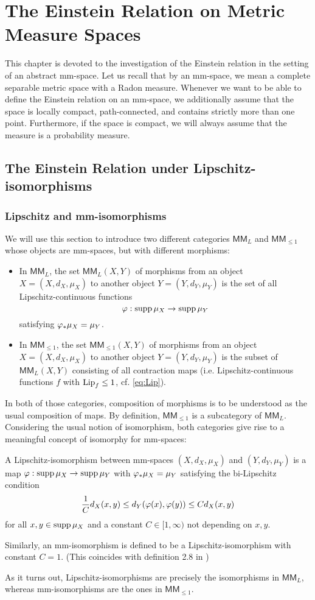 \chapter{The Einstein Relation on Metric Measure Spaces}

This chapter is devoted to the investigation of the Einstein relation in the setting of an abstract mm-space. Let us recall that by an mm-space, we mean a complete separable metric space with a Radon measure. Whenever we want to be able to define the Einstein relation on an mm-space, we additionally assume that the space is locally compact, path-connected, and contains strictly more than one point. Furthermore, if the space is compact, we will always assume that the measure is a probability measure.

\section{The Einstein Relation under Lipschitz-isomorphisms}

\subsection{Lipschitz and mm-isomorphisms}

We will use this section to introduce two different categories $\mathsf{MM}_L$ and $\mathsf{MM}_{\leq1}$ whose objects are mm-spaces, but with different morphisms: 
\begin{itemize}
  \item In $\mathsf{MM}_L$, the set $\mathsf{MM}_L(X,Y)$ of morphisms from an object $X=(X,d_X,\mu_X)$ to another object $Y=(Y,d_Y,\mu_Y)$ is the set of all Lipschitz-continuous functions 
  \[ 
    \varphi:\operatorname{supp}\mu_X\to\operatorname{supp}\mu_Y
  \]
  satisfying $\varphi_*\mu_X=\mu_Y$.
  \item In $\mathsf{MM}_{\leq1}$, the set $\mathsf{MM}_{\leq1}(X,Y)$ of morphisms from an object $X=(X,d_X,\mu_X)$ to another object $Y=(Y,d_Y,\mu_Y)$ is the subset of $\mathsf{MM}_L(X,Y)$ consisting of all contraction maps (i.e. Lipschitz-continuous functions $f$ with $\operatorname{Lip}_f\leq1$, cf. \eqref{eq:Lip}).
\end{itemize}
In both of those categories, composition of morphisms is to be understood as the usual composition of maps. By definition, $\mathsf{MM}_{\leq1}$ is a subcategory of $\mathsf{MM}_L$. Considering the usual notion of isomorphism, both categories give rise to a meaningful concept of isomorphy for mm-spaces: 
\begin{defin}
  A Lipschitz-isomorphism between mm-spaces $(X,d_X,\mu_X)$ and $(Y,d_Y,\mu_Y)$ is a map 
  $\varphi:\operatorname{supp}\mu_X\to\operatorname{supp}\mu_Y$ with $\varphi_*\mu_X=\mu_Y$ satisfying the bi-Lipschitz condition
  \[
    \frac{1}{C}d_X(x,y)\leq d_Y(\varphi(x),\varphi(y))\leq Cd_X(x,y)
  \]
  for all $x,y\in\operatorname{supp}\mu_X$ and a constant $C\in[1,\infty)$ not depending on $x,y$.
  
  Similarly, an mm-isomorphism is defined to be a Lipschitz-isomorphism with constant $C=1$. (This coincides with definition 2.8 in \cite{shioya2016metric})
\end{defin}
As it turns out, Lipschitz-isomorphisms are precisely the isomorphisms in $\mathsf{MM}_L$, whereas mm-isomorphisms are the ones in $\mathsf{MM}_{\leq1}$.

